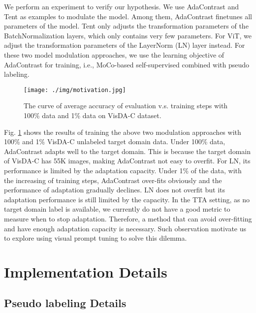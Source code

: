 \documentclass{article} \usepackage{iclr2023_conference,times}
\begin{document}
We perform an experiment to verify our hypothesis. We use AdaContrast \citep{chen2022contrastive} and Tent \citep{wang2020tent} as examples to modulate the model. Among them, AdaContrast finetunes all parameters of the model. Tent only adjusts the transformation parameters of the BatchNormalization layers, which only contains very few parameters. For ViT, we adjust the transformation parameters of the LayerNorm (LN) layer instead. For these two model modulation approaches, we use the learning objective of AdaContrast for training, i.e., MoCo-based self-supervised combined with pseudo labeling. 


\begin{figure}[h]
\begin{center}
\texttt{[image: ./img/motivation.jpg]}
\end{center}
\caption{The curve of average accuracy of evaluation v.s. training steps with 100\% data and 1\% data on VisDA-C dataset.}
\label{fig:motivation}
\end{figure}
 
Fig. \ref{fig:motivation} shows the results of training the above two modulation approaches with 100\% and 1\% VisDA-C unlabeled target domain data. Under 100\% data, AdaContrast adapts well to the target domain. This is because the target domain of VisDA-C has 55K images, making AdaContrast not easy to overfit. For LN, its performance is limited by the adaptation capacity. Under 1\% of the data, with the increasing of training steps, AdaContrast over-fits obviously and the performance of adaptation gradually declines. LN does not overfit but its adaptation performance is still limited by the capacity. In the TTA setting, as no target domain label is available, we currently do not have a good metric to measure when to stop adaptation. Therefore, a method that can avoid over-fitting and have enough adaptation capacity is necessary. Such observation motivate us to explore using visual prompt tuning to solve this dilemma.

\section{Implementation Details}

\subsection{Pseudo labeling Details} \label{appendix:pl}
\end{document}
